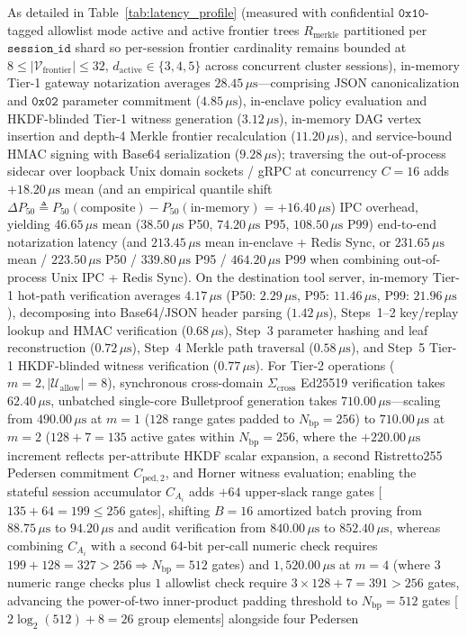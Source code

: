 \documentclass[conference,10pt]{IEEEtran}
\begin{document}
As detailed in Table~\ref{tab:latency_profile} (measured with confidential $\mathtt{0x10}$-tagged allowlist mode active and active frontier trees $R_{\text{merkle}}$ partitioned per $\texttt{session\_id}$ shard so per-session frontier cardinality remains bounded at $8 \le |\mathcal{V}_{\text{frontier}}| \le 32$, $d_{\text{active}} \in \{3, 4, 5\}$ across concurrent cluster sessions), in-memory Tier-1 gateway notarization averages $28.45\,\mu\text{s}$---comprising JSON canonicalization and $\mathtt{0x02}$ parameter commitment ($4.85\,\mu\text{s}$), in-enclave policy evaluation and HKDF-blinded Tier-1 witness generation ($3.12\,\mu\text{s}$), in-memory DAG vertex insertion and depth-4 Merkle frontier recalculation ($11.20\,\mu\text{s}$), and service-bound HMAC signing with Base64 serialization ($9.28\,\mu\text{s}$); traversing the out-of-process sidecar over loopback Unix domain sockets / gRPC at concurrency $C=16$ adds $+18.20\,\mu\text{s}$ mean (and an empirical quantile shift $\Delta P_{50} \triangleq P_{50}(\text{composite}) - P_{50}(\text{in-memory}) = +16.40\,\mu\text{s}$) IPC overhead, yielding $46.65\,\mu\text{s}$ mean ($38.50\,\mu\text{s}$ P50, $74.20\,\mu\text{s}$ P95, $108.50\,\mu\text{s}$ P99) end-to-end notarization latency (and $213.45\,\mu\text{s}$ mean in-enclave + Redis Sync, or $231.65\,\mu\text{s}$ mean / $223.50\,\mu\text{s}$ P50 / $339.80\,\mu\text{s}$ P95 / $464.20\,\mu\text{s}$ P99 when combining out-of-process Unix IPC + Redis Sync). On the destination tool server, in-memory Tier-1 hot-path verification averages $4.17\,\mu\text{s}$ (P50: $2.29\,\mu\text{s}$, P95: $11.46\,\mu\text{s}$, P99: $21.96\,\mu\text{s}$), decomposing into Base64/JSON header parsing ($1.42\,\mu\text{s}$), Steps~1--2 key/replay lookup and HMAC verification ($0.68\,\mu\text{s}$), Step~3 parameter hashing and leaf reconstruction ($0.72\,\mu\text{s}$), Step~4 Merkle path traversal ($0.58\,\mu\text{s}$), and Step~5 Tier-1 HKDF-blinded witness verification ($0.77\,\mu\text{s}$). For Tier-2 operations ($m=2, |\mathcal{U}_{\text{allow}}|=8$), synchronous cross-domain $\Sigma_{\text{cross}}$ Ed25519 verification takes $62.40\,\mu\text{s}$, unbatched single-core Bulletproof generation takes $710.00\,\mu\text{s}$---scaling from $490.00\,\mu\text{s}$ at $m=1$ ($128$ range gates padded to $N_{\text{bp}}=256$) to $710.00\,\mu\text{s}$ at $m=2$ ($128 + 7 = 135$ active gates within $N_{\text{bp}}=256$, where the $+220.00\,\mu\text{s}$ increment reflects per-attribute HKDF scalar expansion, a second Ristretto255 Pedersen commitment $C_{\text{ped}, 2}$, and Horner witness evaluation; enabling the stateful session accumulator $C_{A_i}$ adds $+64$ upper-slack range gates [$135 + 64 = 199 \le 256$ gates], shifting $B=16$ amortized batch proving from $88.75\,\mu\text{s}$ to $94.20\,\mu\text{s}$ and audit verification from $840.00\,\mu\text{s}$ to $852.40\,\mu\text{s}$, whereas combining $C_{A_i}$ with a second 64-bit per-call numeric check requires $199 + 128 = 327 > 256 \Rightarrow N_{\text{bp}} = 512$ gates) and $1{,}520.00\,\mu\text{s}$ at $m=4$ (where $3$ numeric range checks plus $1$ allowlist check require $3 \times 128 + 7 = 391 > 256$ gates, advancing the power-of-two inner-product padding threshold to $N_{\text{bp}} = 512$ gates [$2\log_2(512)+8 = 26$ group elements] alongside four Pedersen 
\end{document}
